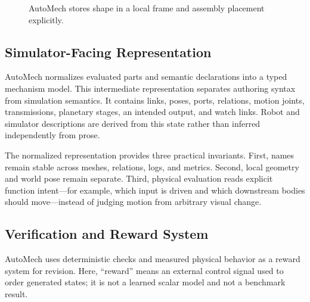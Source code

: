 \documentclass[10pt]{article}
\begin{document}
\begin{figure}[ht]
\centering
{}
\caption{AutoMech stores shape in a local frame and assembly placement explicitly.}
\label{fig:frames}
\end{figure}

\subsection{Simulator-Facing Representation}

AutoMech normalizes evaluated parts and semantic declarations into a typed mechanism model.
This intermediate representation separates authoring syntax from simulation semantics. It
contains links, poses, ports, relations, motion joints, transmissions, planetary stages,
an intended output, and watch links. Robot and simulator descriptions are derived from this
state rather than inferred independently from prose.

The normalized representation provides three practical invariants. First, names remain
stable across meshes, relations, logs, and metrics. Second, local geometry and world pose
remain separate. Third, physical evaluation reads explicit function intent---for example,
which input is driven and which downstream bodies should move---instead of judging motion
from arbitrary visual change.

\subsection{Verification and Reward System}

AutoMech uses deterministic checks and measured physical behavior as a reward system for
revision. Here, ``reward'' means an external control signal used to order generated states;
it is not a learned scalar model and not a benchmark result.
\end{document}
